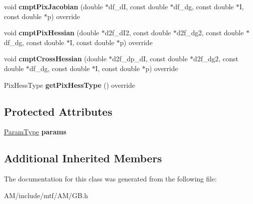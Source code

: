 \begin{DoxyCompactItemize}
\item 
\hypertarget{classGB_a66cb01d0cd132d8ef8d43c2d866142c9}{void {\bfseries cmpt\-Pix\-Jacobian} (double $\ast$df\-\_\-d\-I, const double $\ast$df\-\_\-dg, const double $\ast$I, const double $\ast$p) override}\label{classGB_a66cb01d0cd132d8ef8d43c2d866142c9}

\item 
\hypertarget{classGB_ad01931c3cfa3f53499256ad3bd627860}{void {\bfseries cmpt\-Pix\-Hessian} (double $\ast$d2f\-\_\-d\-I2, const double $\ast$d2f\-\_\-dg2, const double $\ast$df\-\_\-dg, const double $\ast$I, const double $\ast$p) override}\label{classGB_ad01931c3cfa3f53499256ad3bd627860}

\item 
\hypertarget{classGB_a8e3a6fbe468066d6d28afc5e8106182a}{void {\bfseries cmpt\-Cross\-Hessian} (double $\ast$d2f\-\_\-dp\-\_\-d\-I, const double $\ast$d2f\-\_\-dg2, const double $\ast$df\-\_\-dg, const double $\ast$I, const double $\ast$p) override}\label{classGB_a8e3a6fbe468066d6d28afc5e8106182a}

\item 
\hypertarget{classGB_ac0db45fd0f4075ede025b904168e4d6e}{Pix\-Hess\-Type {\bfseries get\-Pix\-Hess\-Type} () override}\label{classGB_ac0db45fd0f4075ede025b904168e4d6e}

\end{DoxyCompactItemize}
\subsection*{Protected Attributes}
\begin{DoxyCompactItemize}
\item 
\hypertarget{classGB_a9998ce554bb94602706dbdf6c4618bde}{\hyperlink{structGBParams}{Param\-Type} {\bfseries params}}\label{classGB_a9998ce554bb94602706dbdf6c4618bde}

\end{DoxyCompactItemize}
\subsection*{Additional Inherited Members}


The documentation for this class was generated from the following file\-:\begin{DoxyCompactItemize}
\item 
A\-M/include/mtf/\-A\-M/G\-B.\-h\end{DoxyCompactItemize}
